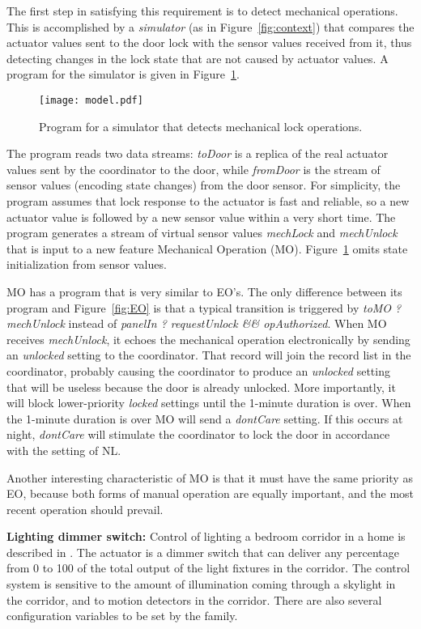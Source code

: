 \documentclass[conference]{IEEEtran}
\begin{document}
The first step in satisfying this requirement
is to detect mechanical operations.
This is accomplished by a {\it simulator} (as in Figure~\ref{fig:context})
that compares the actuator values sent to the door lock with the
sensor values received from it, thus detecting changes in the lock
state that are not caused by actuator values.
A program for the simulator is given in Figure~\ref{fig:model}.

\begin{figure}
\centering
\texttt{[image: model.pdf]}
\caption{Program for a simulator that detects mechanical lock operations.}
\label{fig:model}
\end{figure}

The program reads two data streams:
{\it toDoor} is a replica of the real actuator values sent by the 
coordinator to the door, while
{\it fromDoor} is the stream of sensor values (encoding state changes)
from the door sensor.
For simplicity, the program assumes that lock response to the actuator
is fast and reliable,
so a new actuator value is followed by a new sensor
value within a very short time.
The program generates a stream of virtual sensor values
{\it mechLock} and {\it mechUnlock}
that is input to a new feature Mechanical Operation (MO).
Figure~\ref{fig:model} omits state initialization from sensor values.

MO has a program that is very similar to EO's.
The only difference between its program and Figure~\ref{fig:EO} is 
that a typical transition is triggered by {\it toMO ? mechUnlock}
instead of {\it panelIn ? requestUnlock \&\& opAuthorized}.
When MO receives {\it mechUnlock}, it echoes the
mechanical operation electronically by sending an {\it unlocked}
setting to the coordinator.
That record will join the record list in the coordinator,
probably causing the coordinator to produce an {\it unlocked} setting
that will be useless because the door is already unlocked.
More importantly, it will block 
lower-priority {\it locked} settings until the 1-minute duration is over.
When the 1-minute duration is over MO will send a {\it dontCare}
setting.
If this occurs at night, {\it dontCare} will stimulate the coordinator
to lock the door in accordance with the setting of NL.

Another interesting characteristic of MO is that it must have the
same priority as EO, because both forms of manual operation are
equally important, and the most recent operation should prevail.

\vspace{2mm}
{\bf Lighting dimmer switch:}
Control of
lighting a bedroom corridor in a home is described in \cite{digital-life}.
The actuator is a dimmer switch that can deliver any percentage from 0 to
100 of the total output of the light fixtures in the corridor.
The control system is sensitive to the amount of illumination coming
through a skylight in the corridor, and to motion detectors in the
corridor.
There are also several configuration variables to be set by the family.
\end{document}
